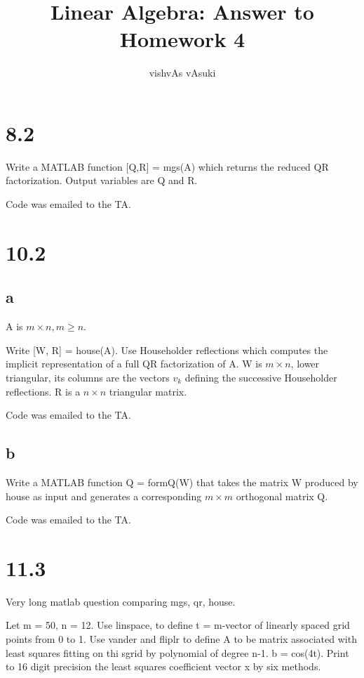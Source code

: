 \documentclass[10pt]{amsart}
\title{Linear Algebra: Answer to Homework 4}
\author{vishvAs vAsuki}
\theoremstyle{remark}
\begin{document}
\maketitle

\section{8.2}
Write a MATLAB function [Q,R] = mgs(A) which returns the reduced QR factorization. Output variables are Q and R.

Code was emailed to the TA.



\section{10.2}
\subsection{a}
A is $m \times n, m\geq  n$.

Write [W, R] = house(A). Use Householder reflections which computes the implicit representation of a full QR factorization of A. W is $m\times n$, lower triangular, its columns are the vectors $v_{k}$ defining the successive Householder reflections. R is a $n\times n$ triangular matrix.

Code was emailed to the TA.



\subsection{b}
Write a MATLAB function Q = formQ(W) that takes the matrix W produced by house as input and generates a corresponding $m \times m$ orthogonal matrix Q.

Code was emailed to the TA.




\section{11.3}
Very long matlab question comparing mgs, qr, house.

Let m = 50, n = 12. Use linspace, to define t = m-vector of linearly spaced grid points from 0 to 1. Use vander and fliplr to define A to be matrix associated with least squares fitting on thi sgrid by polynomial of degree n-1. b = cos(4t). Print to 16 digit precision the least squares coefficient vector x by six methods.
\end{document}
